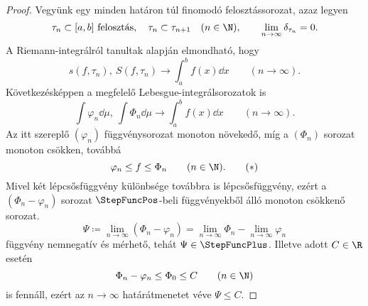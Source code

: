 \documentclass[
]{elteikthesis}[2024/04/26]
\begin{document}
\begin{proof}
		Vegyünk egy minden határon túl finomodó felosztássorozat, azaz legyen
		\[
			\tau_n \subset [a, b] \text{ felosztás}, \quad
			\tau_n \subset \tau_{n + 1} \quad (n \in \N), \qquad
			\lim_{n \to \infty} \delta_{\tau_n} = 0.
		\]
		A Riemann-integrálról tanultak alapján elmondható, hogy
		\[
			s(f, \tau_n), \ S(f, \tau_n) \longrightarrow  \int_a^b f(x) \dd{x}
			\qquad (n \to \infty).
		\]
		Következésképpen a megfelelő Lebesgue-integrálsorozatok is
		\[
			\int \varphi_n \dd{\mu}, \
			\int \Phi_n    \dd{\mu} \longrightarrow  \int_a^b f(x) \dd{x}
			\qquad (n \to \infty).
		\]
		Az itt szereplő \( (\varphi_n) \) függvénysorozat monoton növekedő,
		míg a \( (\Phi_n) \) sorozat monoton csökken, továbbá
		\begin{equation}\label{eq:riemann-lebesgue-01}
			\varphi_n \leq f \leq \Phi_n
			\qquad (n \in \N).
			\tag{\( * \)}
		\end{equation}
		\newpage
		Mivel két lépcsősfüggvény különbsége továbbra is lépcsősfüggvény, 
		ezért a \( (\Phi_n - \varphi_n) \) sorozat \( \StepFuncPos \)-beli függvényekből álló monoton csökkenő sorozat.
		\[
			\Psi \coloneq 
			\lim_{n \to \infty} (\Phi_n - \varphi_n) =
			\lim_{n \to \infty} \Phi_n - \lim_{n \to \infty} \varphi_n
		\]
		függvény nemnegatív és mérhető, tehát \( \Psi \in \StepFuncPlus \). 
		Illetve adott \( C \in \R \) esetén
		\[
			\Phi_n - \varphi_n \leq \Phi_0 \leq C \qquad (n \in \N)
		\]
		is fennáll, 
		ezért az \( n \to \infty \) határátmenetet véve \( \Psi \leq C \).
		

\end{proof}
\end{document}
